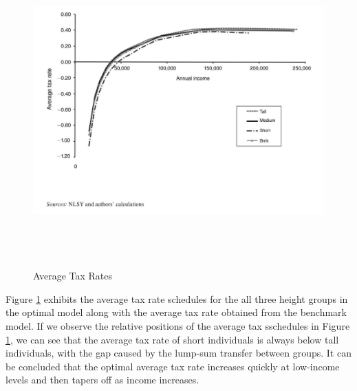 \documentclass[titlepage]{\econtex}
\begin{document}
\begin{figure}[H]
  \centering
  \includegraphics[width=1\textwidth, height=12cm]{AverageTax.JPG}
  \caption{Average Tax Rates}
    \label{fig:Figure 2}
  \end{figure}
   
  Figure \ref{fig:Figure 2} exhibits the average tax rate schedules for the all three height groups in the optimal model along with the average tax rate obtained from the benchmark model. If we observe the relative positions of the average tax sschedules in Figure  \ref{fig:Figure 2}, we can see that the average tax rate of short individuals is always below tall individuals, with the gap caused by the lump-sum transfer between groups. It can be concluded that the optimal average tax rate increases quickly at low-income levels and then tapers off as income increases. 
\end{document}
